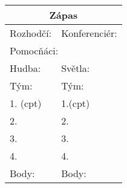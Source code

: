 \documentclass[a4paper,10pt,openany]{book}
\begin{document}
\begin{multicols}{2}

 \begin{tabular}[t]{|p{4cm}|p{4cm}    |}
 \hline 
 \multicolumn{2}{|c|}{\large{Zápas}} \\
  \hline
Rozhodčí:  & Konferenciér: \\
 \hline
\multicolumn{2}{|l|}{ Pomocňáci: }   \\ \hline
Hudba: & Světla: \\ \hline \hline
Tým: &  Tým:\\ \hline
1. \small{(cpt)}  & 1.\small{(cpt)} \\ \hline
2.  & 2. \\ \hline
3. & 3. \\ \hline
4.  & 4. \\ \hline
Body:  & Body: \\ \hline


\end{tabular}
\vspace{3mm}


\end {multicols}
\thispagestyle{empty} 
\renewcommand{\btbinfo}[6]{
\ifx Z#6  \else \large{#1}  \fi

}
\begin{multicols}{2}

\end {multicols}
\pagebreak
\thispagestyle{empty} 
\newcommand{\faulinfo}[5]{
#4 & #1 & #3 & #5 \\

}

\begin{tabular}[t]{|p{3cm}|p{4cm}|p{1cm}|p{6cm}    |}

\end{tabular}
\pagebreak
\setcounter{tocdepth}{1}
\tableofcontents
\end{document}
